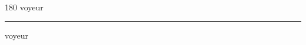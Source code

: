 
\begin{frame}
\begin{center}
\begin{turn}{180}
{\fontsize{2.5cm}{1em}\selectfont voyeur}
\end{turn}
\vspace{1em}\par  
\hrule
\vspace{1em}\par  
{\fontsize{2.5cm}{1em}\selectfont voyeur}
\end{center}
\end{frame}
